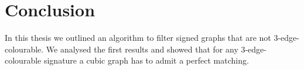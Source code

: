 \chapter*{Conclusion}

In this thesis we outlined an algorithm to filter signed graphs that are not 3-edge-colourable. We analysed the first results and showed that for any 3-edge-colourable signature a cubic graph has to admit a perfect matching.
